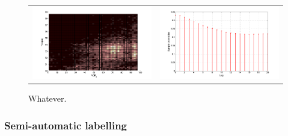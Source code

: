 \begin{figure}
\begin{center}
\begin{tabular}{c@{}c}
\includegraphics[scale=0.2]{./figures/VT_TRQ_ROP_density} &

\includegraphics[scale=0.2]{./figures/VT_crossCorrTRQvsROP}  \\

\end{tabular}
\caption{\label{Figure:VTTorqueRateOfPenetration}  Whatever.}
\end{center}
\end{figure}






\subsubsection{Semi-automatic labelling}

